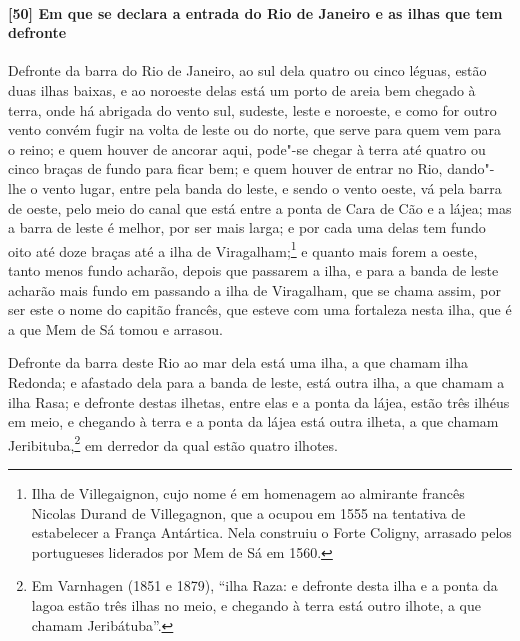 \begin{linenumbers}
\paragraph{[50] Em que se declara a entrada do Rio de Janeiro e as ilhas que tem defronte} \quad
Defronte da barra do Rio de Janeiro, ao sul dela quatro ou cinco léguas, estão duas ilhas
baixas, e ao noroeste delas está um porto de areia bem chegado à terra, onde há abrigada
do vento sul, sudeste, leste e noroeste, e como for outro vento convém fugir na volta de
leste ou do norte, que serve para quem vem para o reino; e quem houver de ancorar aqui,
pode"-se chegar à terra até quatro ou cinco braças de fundo para ficar bem; e quem houver
de entrar no Rio, dando"-lhe o vento lugar, entre pela banda do leste, e sendo o vento
oeste, vá pela barra de oeste, pelo meio do canal que está entre a ponta de Cara de Cão e
a lájea; mas a barra de leste é melhor, por ser mais larga; e por cada uma delas tem fundo
oito até doze braças até a ilha de Viragalham;\footnote{ Ilha de Villegaignon, cujo nome é
em homenagem ao almirante francês Nicolas Durand de Villegagnon, que a ocupou em 1555 na
tentativa de estabelecer a França Antártica. Nela construiu o Forte Coligny, arrasado
pelos portugueses liderados por Mem de Sá em 1560.} e quanto mais forem a oeste, tanto
menos fundo acharão, depois que passarem a ilha, e para a banda de leste acharão mais
fundo em passando a ilha de Viragalham, que se chama assim, por ser este o nome do capitão
francês, que esteve com uma fortaleza nesta ilha, que é a que Mem de Sá tomou e arrasou.

Defronte da barra deste Rio ao mar dela está uma ilha, a que chamam ilha Redonda; e
afastado dela para a banda de leste, está outra ilha, a que chamam a ilha Rasa; e defronte
destas ilhetas, entre elas e a ponta da lájea, estão três ilhéus em meio, e chegando à
terra e a ponta da lájea está outra ilheta, a que chamam Jeribituba,\footnote{ Em
Varnhagen (1851 e 1879), ``ilha Raza: e defronte desta ilha e a ponta da lagoa estão três
ilhas no meio, e chegando à terra está outro ilhote, a que chamam Jeribátuba''.} em
derredor da qual estão quatro ilhotes.


\end{linenumbers}

